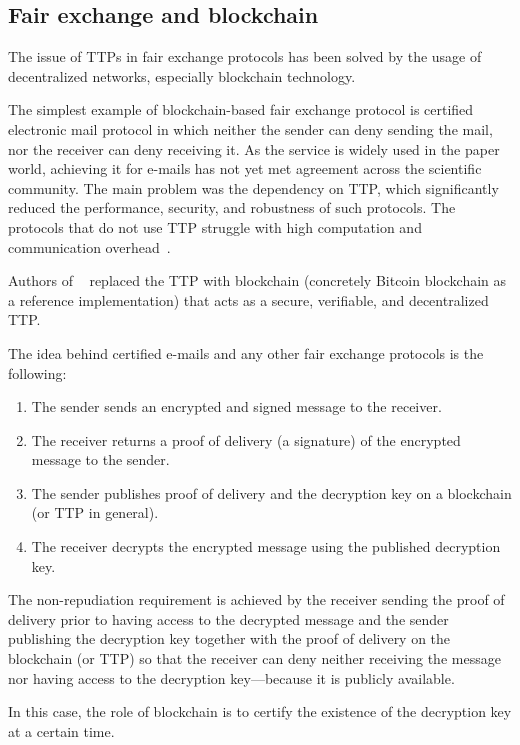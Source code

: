 \documentclass[pdftex,twocolumn,epjc3]{svjour3}
\begin{document}
\subsection{Fair exchange and blockchain}

The issue of TTPs in fair exchange protocols has been solved by the usage of decentralized networks, especially blockchain technology.

The simplest example of blockchain-based fair exchange protocol is certified electronic mail protocol in which neither the sender can deny sending the mail, nor the receiver can deny receiving it. As the service is widely used in the paper world, achieving it for e-mails has not yet met agreement across the scientific community. The main problem was the dependency on TTP, which significantly reduced the performance, security, and robustness of such protocols. The protocols that do not use TTP struggle with high computation and communication overhead~\cite{hinarejosSolutionSecureCertified2019}.

Authors of ~\cite{hinarejosSolutionSecureCertified2019} replaced the TTP with blockchain (concretely Bitcoin blockchain as a reference implementation) that acts as a secure, verifiable, and decentralized TTP.

The idea behind certified e-mails and any other fair exchange protocols is the following:
\begin{enumerate}
    \item The sender sends an encrypted and signed message to the receiver.
    \item The receiver returns a proof of delivery (a signature) of the encrypted message to the sender.
    \item The sender publishes proof of delivery and the decryption key on a blockchain (or TTP in general).
    \item The receiver decrypts the encrypted message using the published decryption key.
\end{enumerate}

The non-repudiation requirement is achieved by the receiver sending the proof of delivery prior to having access to the decrypted message and the sender publishing the decryption key together with the proof of delivery on the blockchain (or TTP) so that the receiver can deny neither receiving the message nor having access to the decryption key—because it is publicly available.

In this case, the role of blockchain is to certify the existence of the decryption key at a certain time.
\end{document}

